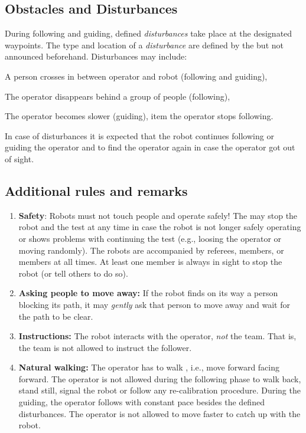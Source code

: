 \subsection{Obstacles and Disturbances}
During following and guiding, defined \emph{disturbances} take place at the designated waypoints.
The type and location of a \emph{disturbance} are defined by the \TC but not announced beforehand.
Disturbances may include:
\begin{compactitem}
\item A person crosses in between operator and robot (following and guiding), 
\item The operator disappears behind a group of people (following),
\item The operator becomes slower (guiding),
item the operator stops following.
\end{compactitem}
In case of disturbances it is expected that the robot continues following or guiding the operator and to find the operator again in case the operator got out of sight.


\subsection{Additional rules and remarks}
\begin{enumerate}
\item \textbf{Safety}: Robots must not touch people and operate safely! 
  The \TC may stop the robot and the test at any time in case the robot is not longer safely operating or shows problems with continuing the test (e.g., loosing the operator or moving randomly).
  The robots are accompanied by referees, \OC members, or \TC members  at all times.
  At least one \TC member is always in sight to stop the robot (or tell others to do so).
\item \textbf{Asking people to move away:} If the robot finds on its way a person blocking its path, it may \textit{gently} ask that person to move away and wait for the path to be clear. 
\item \textbf{Instructions:} The robot interacts with the operator, \emph{not} the team. 
That is, the team is not allowed to instruct the follower.
\item \textbf{Natural walking:} The operator has to walk , i.e., move forward facing forward. 
  The operator is not allowed during the following phase to walk back, stand still, signal the robot or follow any re-calibration procedure.
  During the guiding, the operator follows with constant pace besides the defined disturbances. 
  The operator is not allowed to move faster to catch up with the robot. 
\end{enumerate}

